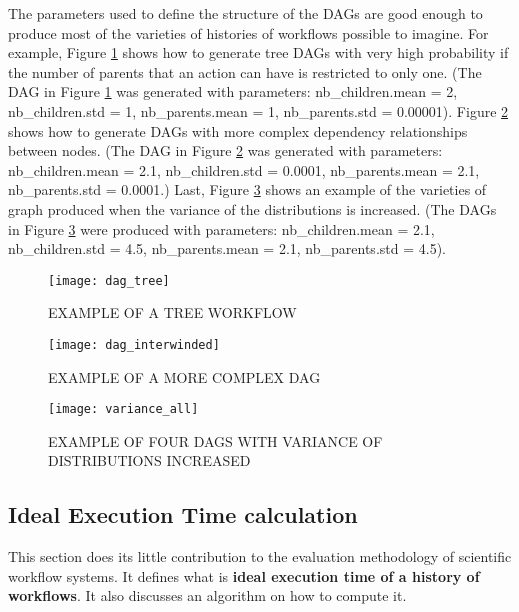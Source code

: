 The parameters used to define the structure of the DAGs are good enough to produce most of the varieties of histories of workflows possible to imagine.  For example, Figure \ref{fig:dag_tree} shows how to generate tree DAGs with very high probability if the number of parents that an action can have is restricted to only one.  (The DAG in Figure \ref{fig:dag_tree} was generated with parameters:
nb\_children.mean = 2, nb\_children.std =  1, nb\_parents.mean = 1, nb\_parents.std = 0.00001). Figure \ref{fig:dag_complex} shows how to generate DAGs with more complex dependency relationships between nodes.  (The DAG in Figure \ref{fig:dag_complex} was generated with parameters:  nb\_children.mean = 2.1, nb\_children.std = 0.0001, nb\_parents.mean = 2.1, nb\_parents.std = 0.0001.) Last, Figure \ref{fig:dag_variety} shows an example of the varieties of graph produced when the variance of the distributions is increased.  (The DAGs in Figure \ref{fig:dag_variety} were produced with parameters: nb\_children.mean = 2.1, nb\_children.std = 4.5, nb\_parents.mean = 2.1, nb\_parents.std = 4.5).
\begin{figure}
\centering
\texttt{[image: dag\_tree]}
\caption{EXAMPLE OF A TREE WORKFLOW}
\label{fig:dag_tree}
\end{figure}
\begin{figure}
\centering
\texttt{[image: dag\_interwinded]}
\caption{EXAMPLE OF A MORE COMPLEX DAG}
\label{fig:dag_complex}
\end{figure}

\begin{figure}
\centering
\texttt{[image: variance\_all]}
\caption{EXAMPLE OF FOUR DAGS WITH VARIANCE OF DISTRIBUTIONS INCREASED}
\label{fig:dag_variety}
\end{figure}


\subsection{Ideal Execution Time calculation}
This section does its little contribution to the evaluation methodology of scientific workflow systems.  It defines what is \textbf{ideal execution time of a history of workflows}.  It also discusses an algorithm on how to compute it.  

